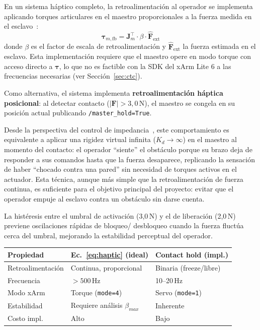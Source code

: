 \documentclass[journal,10pt,twoside]{IEEEtran}
\newcommand{\xarm}{xArm Lite 6}
\begin{document}
En un sistema háptico completo, la retroalimentación al operador se
implementa aplicando torques articulares en el maestro proporcionales
a la fuerza medida en el esclavo~\cite{hogan1985}:
\begin{equation}
  \bm{\tau}_{m,\text{fb}}
    = \bm{J}_m^\top \cdot \beta \cdot \hat{\bm{F}}_{\text{ext}}
  \label{eq:haptic}
\end{equation}
donde $\beta$ es el factor de escala de retroalimentación y
$\hat{\bm{F}}_{\text{ext}}$ la fuerza estimada en el esclavo.
Esta implementación requiere que el maestro opere en modo torque
con acceso directo a $\bm{\tau}$, lo que no es factible con la
SDK del \xarm{} a las frecuencias necesarias (ver
Sección~\ref{sec:ctc}).

Como alternativa, el sistema implementa \textbf{retroalimentación
háptica posicional}: al detectar contacto ($|\bm{F}|>3{,}0$\,N),
el maestro se congela en su posición actual publicando
\texttt{/master\_hold=True}.

Desde la perspectiva del control de impedancia~\cite{hogan1985},
este comportamiento es equivalente a aplicar una rigidez virtual
infinita ($K_d\to\infty$) en el maestro al momento del contacto:
el operador ``siente'' el obstáculo porque su brazo deja de responder
a sus comandos hasta que la fuerza desaparece, replicando la
sensación de haber ``chocado contra una pared'' sin necesidad de
torques activos en el actuador. Esta técnica, aunque más simple que
la retroalimentación de fuerza continua, es suficiente para el
objetivo principal del proyecto: evitar que el operador empuje al
esclavo contra un obstáculo sin darse cuenta.

La histéresis entre el umbral de activación (3{,}0\,N) y el de
liberación (2{,}0\,N) previene oscilaciones rápidas de bloqueo/
desbloqueo cuando la fuerza fluctúa cerca del umbral, mejorando
la estabilidad perceptual del operador.

\begin{infobox}
  \small
  \begin{tabular}{p{2.0cm}p{2.0cm}p{2.0cm}}
    \toprule
    \textbf{Propiedad} & \textbf{Ec.~\eqref{eq:haptic} (ideal)} & \textbf{Contact hold (impl.)}\\
    \midrule
    Retroalimentación & Continua, proporcional & Binaria (freeze/libre)\\
    Frecuencia & $>500$\,Hz & 10--20\,Hz\\
    Modo xArm & Torque (\texttt{mode=4}) & Servo (\texttt{mode=1})\\
    Estabilidad & Requiere análisis $\beta_{max}$ & Inherente\\
    Costo impl. & Alto & Bajo\\
    \bottomrule
  \end{tabular}
\end{infobox}
\end{document}
